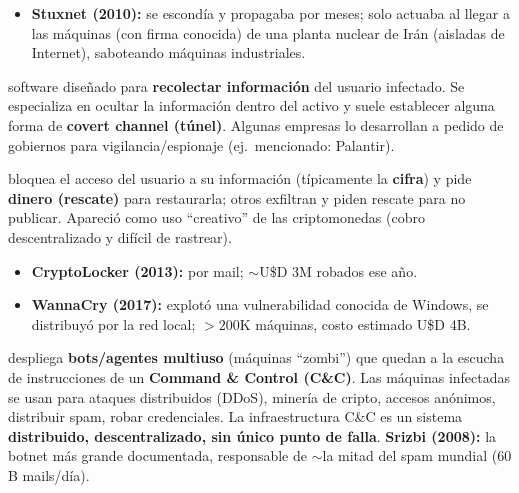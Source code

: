 \documentclass[../main.tex]{subfiles}
\begin{document}
\begin{description}
\begin{itemize}[noitemsep]
          \item \textbf{Stuxnet (2010):} se escondía y propagaba por meses; solo
                actuaba al llegar a las máquinas (con firma conocida) de una planta
                nuclear de Irán (aisladas de Internet), saboteando máquinas
                industriales.
        \end{itemize}
  \item[Spyware:] software diseñado para \textbf{recolectar información} del usuario
        infectado. Se especializa en ocultar la información dentro del activo y suele
        establecer alguna forma de \textbf{covert channel (túnel)}. Algunas empresas
        lo desarrollan a pedido de gobiernos para vigilancia/espionaje (ej.\
        mencionado: Palantir).
  \item[Ransomware:] bloquea el acceso del usuario a su información (típicamente la
        \textbf{cifra}) y pide \textbf{dinero (rescate)} para restaurarla; otros
        exfiltran y piden rescate para no publicar. Apareció como uso ``creativo''
        de las criptomonedas (cobro descentralizado y difícil de rastrear).
        \begin{itemize}[noitemsep]
          \item \textbf{CryptoLocker (2013):} por mail; $\sim$U\$D 3M robados ese año.
          \item \textbf{WannaCry (2017):} explotó una vulnerabilidad conocida de
                Windows, se distribuyó por la red local; $>200$K máquinas, costo
                estimado U\$D 4B.
        \end{itemize}
  \item[Botnet:] despliega \textbf{bots/agentes multiuso} (máquinas ``zombi'') que
        quedan a la escucha de instrucciones de un \textbf{Command \& Control (C\&C)}.
        Las máquinas infectadas se usan para ataques distribuidos (DDoS), minería de
        cripto, accesos anónimos, distribuir spam, robar credenciales. La
        infraestructura C\&C es un sistema \textbf{distribuido, descentralizado, sin
        único punto de falla}. \textbf{Srizbi (2008):} la botnet más grande
        documentada, responsable de $\sim$la mitad del spam mundial ($60$B mails/día).
\end{description}
\end{document}
